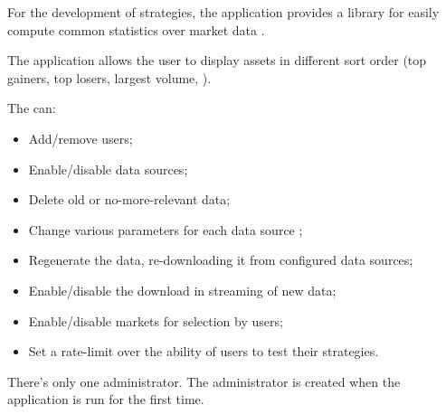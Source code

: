 For the development of strategies, the application provides a library for easily
compute common statistics over market data .

The application allows the user to display assets in different sort order (top
gainers, top losers, largest volume, \etc).

The  can:
\begin{itemize}
	\item Add/remove users;
	\item Enable/disable data sources;
	\item Delete old or no-more-relevant data;
	\item Change various parameters for each data source ;
	\item Regenerate the data, re-downloading it from configured data
		sources;
	\item Enable/disable the download in streaming of new data;
	\item Enable/disable markets for selection by users;
	\item Set a rate-limit over the ability of users to test their
		strategies.
\end{itemize}

There's only one administrator. The administrator is created when the
application is run for the first time.
